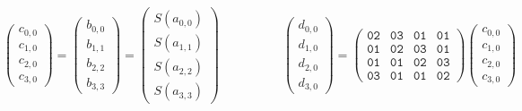 \begin{center}
\resizebox{.9\textwidth}{!}{}
\end{center}
\begin{center}
\resizebox{.9\textwidth}{!}{}
\end{center}
\begin{center}
\resizebox{.9\textwidth}{!}{}
\end{center}

\newpage
\begin{center}

\end{center}
\[\begin{pmatrix}
	c_{0,0} \\ c_{1,0} \\ c_{2,0} \\ c_{3,0}
\end{pmatrix} = \begin{pmatrix}
	b_{0,0} \\ b_{1,1} \\ b_{2,2} \\ b_{3,3}
\end{pmatrix} = \begin{pmatrix}
S(a_{0,0}) \\ S(a_{1,1}) \\ S(a_{2,2}) \\ S(a_{3,3})
\end{pmatrix}\quad\quad\quad\quad\quad
\begin{pmatrix}
	d_{0,0} \\ d_{1,0} \\ d_{2,0} \\ d_{3,0}
\end{pmatrix} = \begin{pmatrix}
	\texttt{02} & \texttt{03} & \texttt{01} & \texttt{01} \\
	\texttt{01} & \texttt{02} & \texttt{03} & \texttt{01} \\
	\texttt{01} & \texttt{01} & \texttt{02} & \texttt{03} \\
	\texttt{03} & \texttt{01} & \texttt{01} & \texttt{02}
\end{pmatrix}\begin{pmatrix}
	c_{0,0} \\ c_{1,0} \\ c_{2,0} \\ c_{3,0}
\end{pmatrix}
\]
